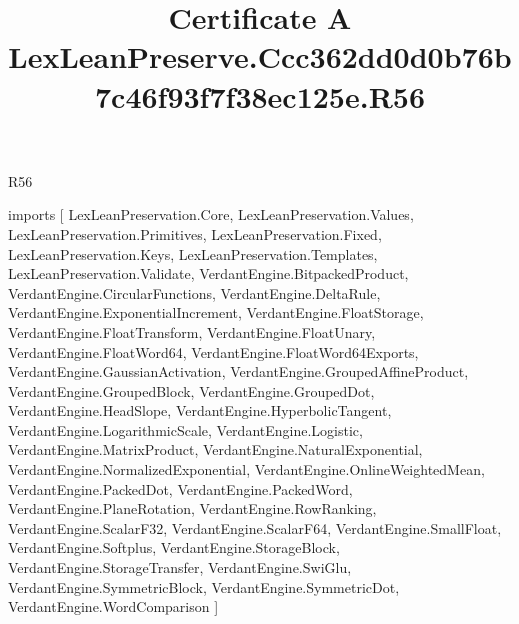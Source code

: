 \begin{lexlean}{R56}
\title{Certificate A LexLeanPreserve.Ccc362dd0d0b76b7c46f93f7f38ec125e.R56}
\begin{coremodule}
imports [
  LexLeanPreservation.Core,
  LexLeanPreservation.Values,
  LexLeanPreservation.Primitives,
  LexLeanPreservation.Fixed,
  LexLeanPreservation.Keys,
  LexLeanPreservation.Templates,
  LexLeanPreservation.Validate,
  VerdantEngine.BitpackedProduct,
  VerdantEngine.CircularFunctions,
  VerdantEngine.DeltaRule,
  VerdantEngine.ExponentialIncrement,
  VerdantEngine.FloatStorage,
  VerdantEngine.FloatTransform,
  VerdantEngine.FloatUnary,
  VerdantEngine.FloatWord64,
  VerdantEngine.FloatWord64Exports,
  VerdantEngine.GaussianActivation,
  VerdantEngine.GroupedAffineProduct,
  VerdantEngine.GroupedBlock,
  VerdantEngine.GroupedDot,
  VerdantEngine.HeadSlope,
  VerdantEngine.HyperbolicTangent,
  VerdantEngine.LogarithmicScale,
  VerdantEngine.Logistic,
  VerdantEngine.MatrixProduct,
  VerdantEngine.NaturalExponential,
  VerdantEngine.NormalizedExponential,
  VerdantEngine.OnlineWeightedMean,
  VerdantEngine.PackedDot,
  VerdantEngine.PackedWord,
  VerdantEngine.PlaneRotation,
  VerdantEngine.RowRanking,
  VerdantEngine.ScalarF32,
  VerdantEngine.ScalarF64,
  VerdantEngine.SmallFloat,
  VerdantEngine.Softplus,
  VerdantEngine.StorageBlock,
  VerdantEngine.StorageTransfer,
  VerdantEngine.SwiGlu,
  VerdantEngine.SymmetricBlock,
  VerdantEngine.SymmetricDot,
  VerdantEngine.WordComparison
]


\end{coremodule}
\end{lexlean}
